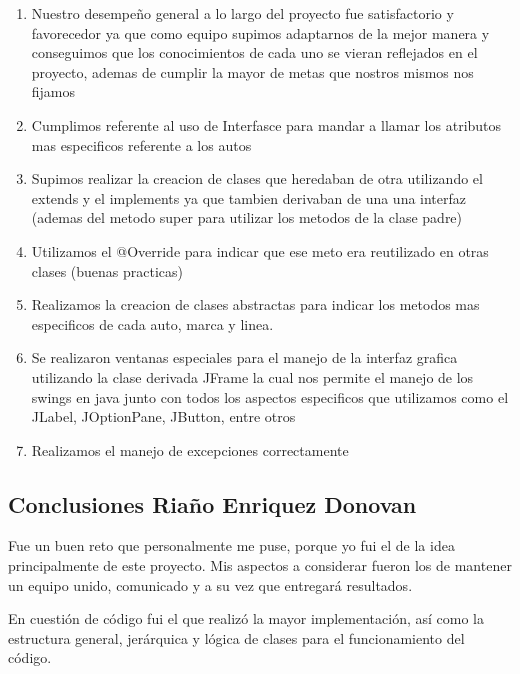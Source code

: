 \documentclass{article}
\begin{document}
\begin{enumerate}
\item Nuestro desempeño general a lo largo del proyecto fue satisfactorio y favorecedor ya que como equipo supimos adaptarnos de la mejor manera y conseguimos que los conocimientos de cada uno se vieran reflejados en el proyecto, ademas de cumplir la mayor de metas que nostros mismos nos fijamos

\item Cumplimos referente al uso de Interfasce para mandar a llamar los atributos mas especificos  referente a los autos 

\item Supimos realizar la creacion de clases que heredaban de otra utilizando el extends y el implements ya que tambien derivaban de una una interfaz (ademas del metodo super para utilizar los metodos de la clase padre)

\item Utilizamos el @Override para indicar que ese meto era reutilizado en otras clases (buenas practicas)

\item Realizamos la creacion de clases abstractas para indicar los metodos mas especificos de cada auto, marca y linea.

\item Se realizaron ventanas especiales para el manejo de la interfaz grafica utilizando la clase derivada JFrame la cual nos permite el manejo de los swings en java junto con todos los aspectos especificos que utilizamos como el JLabel, JOptionPane, JButton, entre otros

\item Realizamos el manejo de excepciones correctamente

\end{enumerate}



\subsection{Conclusiones Riaño Enriquez Donovan}

Fue un buen reto que personalmente me puse, porque yo fui el de la idea principalmente de este proyecto. Mis aspectos a considerar fueron los de mantener un equipo unido, comunicado y a su vez que entregará resultados.\newline

En cuestión de código fui el que realizó la mayor implementación, así como la estructura general, jerárquica y lógica de clases para el funcionamiento del código.\newline
\end{document}
